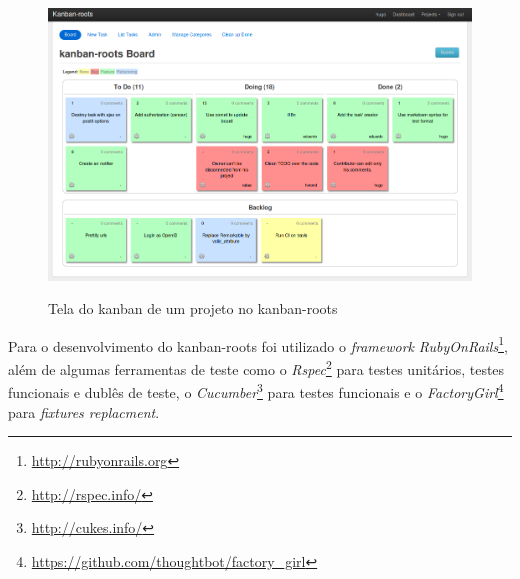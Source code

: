 \begin{figure}[h]
    \center
    \caption{Tela do kanban de um projeto no kanban-roots}
    \includegraphics[scale=0.45]{images/kanban-roots}
    \label{img:tela_kaban_roots}
\end{figure}

Para o desenvolvimento do kanban-roots foi utilizado o \textit{framework}
\textit{RubyOnRails}\footnote{\url{http://rubyonrails.org}}, além de algumas
ferramentas de teste como o \textit{Rspec}\footnote{\url{http://rspec.info/}}
para testes unitários, testes funcionais e dublês de teste, o
\textit{Cucumber}\footnote{\url{http://cukes.info/}} para testes funcionais e o
\textit{FactoryGirl}\footnote{\url{https://github.com/thoughtbot/factory_girl}}
para \textit{fixtures replacment}.